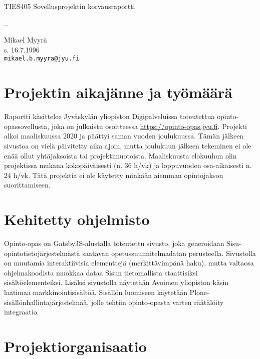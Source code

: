 \documentclass[11pt]{article}
\begin{document}
\begin{center}
\vspace{2cm}
\LARGE
TIES405 Sovellusprojektin korvausraportti

\vspace{10pt}
\large
\number\day.\number\month.\number\year

\vspace{10pt}
Mikael Myyrä \\
s. 16.7.1996\\
\texttt{mikael.b.myyra@jyu.fi}\\
\end{center}
\vspace{10pt}

\section{Projektin aikajänne ja työmäärä}

Raportti käsittelee Jyväskylän yliopiston Digipalveluissa toteutettua
opinto-opassovellusta, joka on julkaistu osoitteessa
\url{https://opinto-opas.jyu.fi}.  Projekti alkoi maaliskuussa 2020 ja päättyi
saman vuoden joulukuussa. Tämän jälkeen sivustoa on vielä päivitetty aika
ajoin, mutta joulukuun jälkeen tekeminen ei ole enää ollut yhtäjaksoista tai
projektimuotoista. Maaliskuusta elokuuhun olin projektissa mukana
kokopäiväisesti (n. 36 h/vk) ja loppuvuoden osa-aikaisesti n. 24 h/vk. Tätä
projektia ei ole käytetty minkään aiemman opintojakson suorittamiseen.

\section{Kehitetty ohjelmisto}

Opinto-opas on GatsbyJS-alustalla toteutettu sivusto, joka
generoidaan Sisu-opintotieto\-järjestel\-mästä saatavan opetussuunnitelmadatan
perusteella. Sivustolla on muutamia interaktiivisia elementtejä
(merkittävimpänä haku), mutta valtaosa ohjelmakoodista muokkaa dataa Sisun
tieto\-mallis\-ta staattisiksi sisältöelementeiksi. Lisäksi sivustolla näytetään
Avoi\-men yliopiston käsin laatimaa mark\-kinointisisältöä. Sisällön luomiseen
käytetään Plone-sisällön\-hallintajärjestelmää, jolle tehtiin opinto-opasta varten
räätälöity integraatio.

\section{Projektiorganisaatio}
\end{document}
